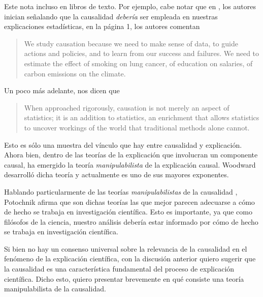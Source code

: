 Este  nota incluso en libros de texto. Por ejemplo, cabe notar que en \parencite{Pearl2016}, los autores inician señalando que la causalidad \emph{debería} ser empleada en nuestras explicaciones estadísticas, en la página 1, los autores comentan

    \begin{quote}
    We study causation because we need to make sense of data, to
    guide actions and policies, and to learn from our success and
    failures. We need to estimate the effect of smoking on lung
    cancer, of education on salaries, of carbon emissions on the
    climate.
    \end{quote}

Un poco más adelante, nos dicen que

    \begin{quote}
    When approached rigorously, causation is not merely an aspect of
    statistics; it is an addition to statistics, an enrichment that
    allows statistics to uncover workings of the world that
    traditional methods alone cannot.
    \end{quote}

Esto es sólo una muestra del vínculo que hay entre causalidad y
explicación. Ahora bien, dentro de las teorías de la explicación que
involucran un componente causal, ha emergido la teoría
\emph{manipulabilista} de la explicación causal. Woodward desarrolló
dicha teoría y actualmente es uno de sus mayores exponentes.

Hablando particularmente de las teorías \emph{manipulabilistas} de
la causalidad \parencite{sep-causation-mani}, Potochnik afirma que
son dichas teorías las que mejor parecen adecuarse a cómo de hecho
se trabaja en investigación científica. Esto es importante, ya que
como filósofos de la ciencia, nuestro análisis debería estar
informado por cómo de hecho se trabaja en investigación
científica.

Si bien no hay un consenso universal sobre la relevancia de la
causalidad en el fenómeno de la explicación científica, con la
discusión anterior quiero sugerir que la causalidad es una
característica fundamental del proceso de explicación científica.
Dicho esto, quiero presentar brevemente en qué consiste una teoría
manipulabilista de la causalidad.

